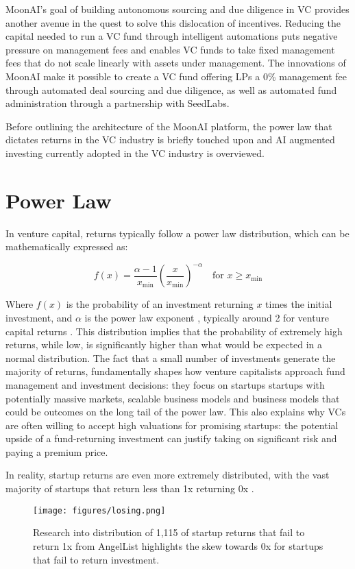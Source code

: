 \documentclass[a4paper, oneside]{discothesis}
\begin{document}
MoonAI's goal of building autonomous sourcing and due diligence in VC provides another avenue in the quest to solve this dislocation of incentives. Reducing the capital needed to run a VC fund through intelligent automations puts negative pressure on management fees and enables VC funds to take fixed management fees that do not scale linearly with assets under management. The innovations of MoonAI make it possible to create a VC fund offering LPs a 0\% management fee through automated deal sourcing and due diligence, as well as automated fund administration through a partnership with SeedLabs. 

Before outlining the architecture of the MoonAI platform, the power law that dictates returns in the VC industry is briefly touched upon and AI augmented investing currently adopted in the VC industry is overviewed.

\section{Power Law}

In venture capital, returns typically follow a power law distribution, which can be mathematically expressed as:

\begin{equation}
f(x) = \frac{\alpha - 1}{x_{\text{min}}} \left(\frac{x}{x_{\text{min}}}\right)^{-\alpha} \quad \text{for } x \geq x_{\text{min}}
\end{equation}

Where $f(x)$ is the probability of an investment returning $x$ times the initial investment, and $\alpha$ is the power law exponent \cite{clauset2009power}, typically around 2 for venture capital returns \cite{farina_arpaia_2023_venture_capital_portfolio_construction}. This distribution implies that the probability of extremely high returns, while low, is significantly higher than what would be expected in a normal distribution. The fact that a small number of investments generate the majority of returns, fundamentally shapes how venture capitalists approach fund management and investment decisions: they focus on startups startups with potentially massive markets, scalable business models and business models that could be outcomes on the long tail of the power law. This also explains why VCs are often willing to accept high valuations for promising startups: the potential upside of a fund-returning investment can justify taking on significant risk and paying a premium price.

In reality, startup returns are even more extremely distributed, with the vast majority of startups that return less than 1x returning 0x \cite{othman2019startup}.
\begin{figure}[htbp]
    \centering
    \texttt{[image: figures/losing.png]}
    \caption{Research into distribution of 1,115 of startup returns that fail to return 1x from AngelList highlights the skew towards 0x for startups that fail to return investment. \cite{othman2022howmuchcanyouloseonafailedstartupinvestment}}
    \label{fig:startup_returns_distribution}
\end{figure}
\end{document}
